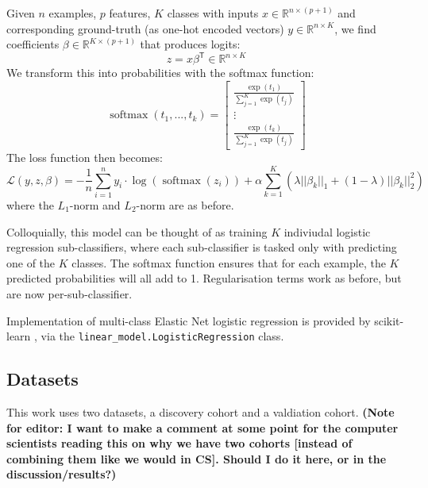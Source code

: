 \documentclass{article}
\DeclareMathOperator*{\softmax}{softmax}
\begin{document}
Given \(n\) examples, \(p\) features, \(K\) classes with inputs \(x \in \mathbb{R}^{n \times (p + 1)}\) and corresponding ground-truth (as one-hot encoded vectors) \(y \in \mathbb{R}^{n \times K}\), we find coefficients \(\beta \in \mathbb{R}^{K \times (p + 1)}\) that produces logits:
\[z = x \beta^\mathsf{T} \in \mathbb{R}^{n \times K}\]
We transform this into probabilities with the softmax function:
\[\softmax(t_1,... , t_k) =
    \begin{bmatrix}
        \frac{\exp(t_1)}{\sum_{j=1}^{K} \exp(t_j)} \\
        \vdots                                     \\
        \frac{\exp(t_k)}{\sum_{j=1}^{K} \exp(t_j)}
    \end{bmatrix}
\]
The loss function then becomes:
\[\mathcal{L}(y, z, \beta) = -\frac{1}{n}\sum_{i=1}^{n} y_i \cdot \log(\softmax(z_i)) + \alpha\sum_{k=1}^{K}(\lambda||\beta_k||_1 + (1 - \lambda)||\beta_k||_2^2)\]
where the \(L_1\)-norm and \(L_2\)-norm are as before.

Colloquially, this model can be thought of as training \(K\) indiviudal logistic regression sub-classifiers, where each sub-classifier is tasked only with predicting one of the \(K\) classes. The softmax function ensures that for each example, the \(K\) predicted probabilities will all add to 1. Regularisation terms work as before, but are now per-sub-classifier.

Implementation of multi-class Elastic Net logistic regression is provided by scikit-learn \cite{scikit-learn}, via the \verb|linear_model.LogisticRegression| class.

\subsection{Datasets}
This work uses two datasets, a discovery cohort and a valdiation cohort. \textbf{(Note for editor: I want to make a comment at some point for the computer scientists reading this on why we have two cohorts [instead of combining them like we would in CS]. Should I do it here, or in the discussion/results?)}
\end{document}
